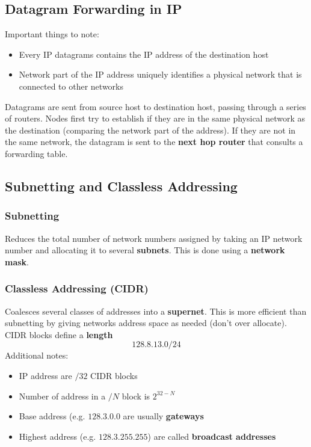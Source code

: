 \documentclass{article}
\begin{document}
  \subsection{Datagram Forwarding in IP}
  Important things to note:
  \begin{itemize}
    \item Every IP datagrams contains the IP address of the destination host
    \item Network part of the IP address uniquely identifies a physical network that is connected to other networks
  \end{itemize}
  Datagrams are sent from source host to destination host, passing through a series of routers. Nodes first try to establish if they are in the same physical network as the destination (comparing the network part of the address). If they are not in the same network, the datagram is sent to the \textbf{next hop router} that consults a forwarding table.
  \subsection{Subnetting and Classless Addressing}
  \subsubsection{Subnetting}
  Reduces the total number of network numbers assigned by taking an IP network number and allocating it to several \textbf{subnets}. This is done using a \textbf{network mask}.
  \subsubsection{Classless Addressing (CIDR)}
  Coalesces several classes of addresses into a \textbf{supernet}. This is more efficient than subnetting by giving networks address space as needed (don't over allocate). CIDR blocks define a \textbf{length} 
  \[128.8.13.0/24\]
  Additional notes:
  \begin{itemize}
    \item IP address are $/32$ CIDR blocks
    \item Number of address in a $/N$ block is $2^{32-N}$
    \item Base address (e.g. $128.3.0.0$ are usually \textbf{gateways}
    \item Highest address (e.g. $128.3.255.255$) are called \textbf{broadcast addresses}
  \end{itemize}
\end{document}
